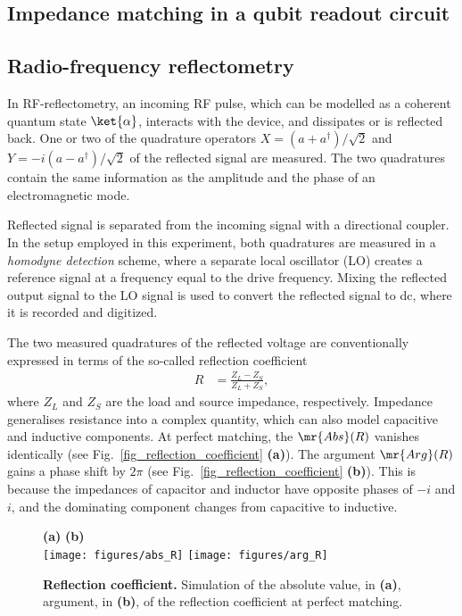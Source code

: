 \documentclass[10pt,a4paper,twoside]{article}
\begin{document}
\begin{multicols}{2}
\section{Impedance matching in a qubit readout circuit}
\subsection{Radio-frequency reflectometry}
In RF-reflectometry, an incoming RF pulse, which can be modelled as a coherent quantum state $\ket{\alpha}$, interacts with the device, and dissipates or is reflected back. One or two of the quadrature operators $X = (a + a^{\dagger})/\sqrt{2}$ and $Y = -i(a - a^{\dagger})/\sqrt{2}$ of the reflected signal are measured. The two quadratures contain the same information as the amplitude and the phase of an electromagnetic mode. 
\par
Reflected signal is separated from the incoming signal with a directional coupler. In the setup employed in this experiment, both quadratures are measured in a \textit{homodyne detection} scheme, where a separate local oscillator (LO) creates a reference signal at a frequency equal to the drive frequency. Mixing the reflected output signal to the LO signal is used to convert the reflected signal to dc, where it is recorded and digitized. 
\par
The two measured quadratures of the reflected voltage are conventionally expressed in terms of the so-called reflection coefficient 
\begin{align*}
R &= \frac{ Z_L - Z_S }{ Z_L + Z_S },
\end{align*}
where $Z_L$ and $Z_S$ are the load and source impedance, respectively. Impedance generalises resistance into a complex quantity, which can also model capacitive and inductive components. At perfect matching, the $\mr{Abs}(R)$ vanishes identically (see Fig.~\ref{fig_reflection_coefficient} \textbf{(a)}). The argument $\mr{Arg}(R)$ gains a phase shift by $2\pi$ (see Fig.~\ref{fig_reflection_coefficient} \textbf{(b)}). This is because the impedances of capacitor and inductor have opposite phases of $-i$ and $i$, and the dominating component changes from capacitive to inductive.
\begin{figure*}
\hspace{-8em}\textbf{(a)} \hspace{22em} \textbf{(b)}
\\
\centering
\texttt{[image: figures/abs\_R]}
\texttt{[image: figures/arg\_R]}
\caption{\textbf{Reflection coefficient.} Simulation of the absolute value, in \textbf{(a)}, argument, in \textbf{(b)}, of the reflection coefficient at perfect matching.}

\end{figure*}
\end{multicols}
\end{document}
